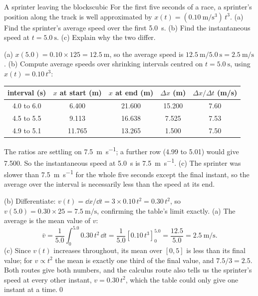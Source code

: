 \begin{example}{A sprinter leaving the blocks}{cubic}
For the first five seconds of a race, a sprinter's position along the track is well approximated by $x(t) = (\SI{0.10}{\metre\per\second\cubed})\,t^3$. (a) Find the sprinter's average speed over the first \SI{5.0}{\second}. (b) Find the instantaneous speed at $t = \SI{5.0}{\second}$. (c) Explain why the two differ.

\elem (a) $x(5.0) = 0.10 \times 125 = \SI{12.5}{\metre}$, so the average speed is $\SI{12.5}{\metre}/\SI{5.0}{\second} = \SI{2.5}{\metre\per\second}$. (b) Compute average speeds over shrinking intervals centred on $t = \SI{5.0}{\second}$, using $x(t) = 0.10\,t^3$:
\begin{center}
\renewcommand{\arraystretch}{1.2}
\begin{tabular}{ccccc}
\toprule
interval (s) & $x$ at start (m) & $x$ at end (m) & $\Delta x$ (m) & $\Delta x/\Delta t$ (m/s) \\
\midrule
4.0 to 6.0 & 6.400 & 21.600 & 15.200 & 7.60 \\
4.5 to 5.5 & 9.113 & 16.638 & 7.525 & 7.53 \\
4.9 to 5.1 & 11.765 & 13.265 & 1.500 & 7.50 \\
\bottomrule
\end{tabular}
\end{center}
The ratios are settling on \SI{7.5}{\metre\per\second}; a further row (\num{4.99} to \num{5.01}) would give \num{7.500}. So the instantaneous speed at \SI{5.0}{\second} is \SI{7.5}{\metre\per\second}. (c) The sprinter was slower than \SI{7.5}{\metre\per\second} for the whole five seconds except the final instant, so the average over the interval is necessarily less than the speed at its end.

\calc (b) Differentiate: $v(t) = \dd x/\dd t = 3 \times 0.10\,t^2 = 0.30\,t^2$, so $v(5.0) = 0.30 \times 25 = \SI{7.5}{\metre\per\second}$, confirming the table's limit exactly. (a) The average is the mean value of $v$:
\[
\bar v = \frac{1}{5.0}\int_0^{5.0} 0.30\,t^2\,\dd t = \frac{1}{5.0}\left[0.10\,t^3\right]_0^{5.0} = \frac{12.5}{5.0} = \SI{2.5}{\metre\per\second}.
\]
(c) Since $v(t)$ increases throughout, its mean over $[0, 5]$ is less than its final value; for $v \propto t^2$ the mean is exactly one third of the final value, and $7.5/3 = 2.5$. Both routes give both numbers, and the calculus route also tells us the sprinter's speed at every other instant, $v = 0.30\,t^2$, which the table could only give one instant at a time.\qed
\end{example}

